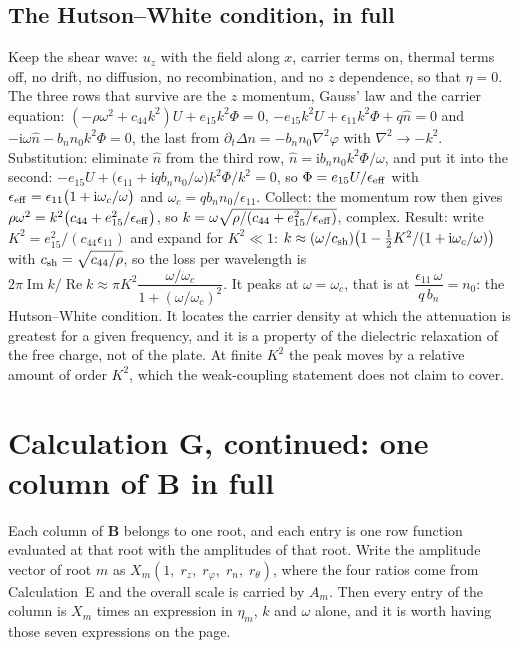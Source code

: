 \documentclass[11pt]{article}
\makeatletter
\newif\ifshowworked
\newenvironment{worked}{%
  \ifshowworked\par\smallskip\noindent\textit{Working.}\par\smallskip\else
  \setbox\z@\vbox\bgroup\fi}{\ifshowworked\par\smallskip\else\egroup\fi}
\newcommand{\ii}{\mathrm{i}}
\makeatother
\begin{document}
\subsection*{The Hutson--White condition, in full}

\begin{worked}
Keep the shear wave: $u_z$ with the field along $x$, carrier terms on, thermal terms off, no drift, no
diffusion, no recombination, and no $z$ dependence, so that $\eta=0$. The three rows that survive are the
$z$ momentum, Gauss' law and the carrier equation:
$(-\rho\omega^2+c_{44}k^2)U+e_{15}k^2\Phi=0$, $-e_{15}k^2U+\epsilon_{11}k^2\Phi+q\hat n=0$ and
$-\ii\omega\hat n-b_nn_0k^2\Phi=0$, the last from $\partial_t\Delta n=-b_nn_0\nabla^2\varphi$ with
$\nabla^2\to-k^2$.
Substitution: eliminate $\hat n$ from the third row, $\hat n=\ii b_nn_0k^2\Phi/\omega$, and put it into
the second: $-e_{15}U+\bigl(\epsilon_{11}+\ii qb_nn_0/\omega\bigr)k^2\Phi/k^2=0$, so
$\Phi=e_{15}U/\epsilon_{\rm eff}$ with
$\epsilon_{\rm eff}=\epsilon_{11}\bigl(1+\ii\omega_c/\omega\bigr)$ and
$\omega_c=qb_nn_0/\epsilon_{11}$.
Collect: the momentum row then gives $\rho\omega^2=k^2\bigl(c_{44}+e_{15}^2/\epsilon_{\rm eff}\bigr)$, so
$k=\omega\sqrt{\rho/(c_{44}+e_{15}^2/\epsilon_{\rm eff})}$, complex.
Result: write $K^2=e_{15}^2/(c_{44}\epsilon_{11})$ and expand for $K^2\ll1$:
$k\approx(\omega/c_{\rm sh})\bigl(1-\tfrac12 K^2/(1+\ii\omega_c/\omega)\bigr)$ with
$c_{\rm sh}=\sqrt{c_{44}/\rho}$, so the loss per wavelength is
$2\pi\operatorname{Im}k/\operatorname{Re}k\approx\pi K^2\dfrac{\omega/\omega_c}{1+(\omega/\omega_c)^2}$.
It peaks at $\omega=\omega_c$, that is at
$\dfrac{\epsilon_{11}\,\omega}{q\,b_n}=n_0$:
the Hutson--White condition. It locates the carrier density at which the attenuation is greatest for a
given frequency, and it is a property of the dielectric relaxation of the free charge, not of the plate.
At finite $K^2$ the peak moves by a relative amount of order $K^2$, which the weak-coupling statement does
not claim to cover.
\end{worked}

\section{Calculation G, continued: one column of $\mathbf B$ in full}

Each column of $\mathbf B$ belongs to one root, and each entry is one row function evaluated at that root
with the amplitudes of that root. Write the amplitude vector of root $m$ as
$X_m(1,\;r_z,\;r_\varphi,\;r_n,\;r_\theta)$, where the four ratios come from Calculation~E and the overall
scale is carried by $A_m$. Then every entry of the column is $X_m$ times an expression in $\eta_m$, $k$
and $\omega$ alone, and it is worth having those seven expressions on the page.
\end{document}
